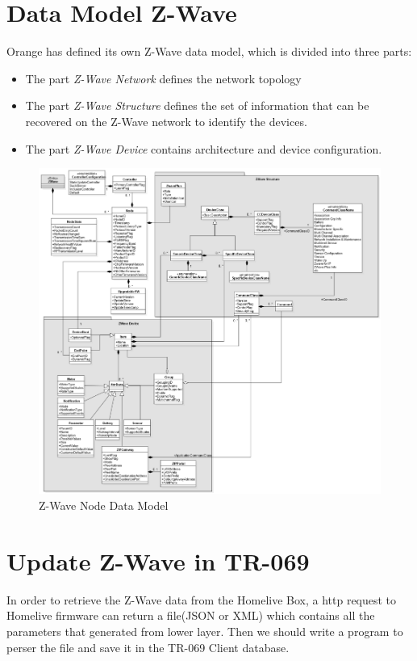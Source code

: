 \section{Data Model Z-Wave}
Orange has defined its own Z-Wave data model, which is divided into three parts:
\begin{itemize}
  \item The part \textit{Z-Wave Network} defines the network topology
  \item The part \textit{Z-Wave Structure} defines the set of information that can be recovered on the Z-Wave network to identify the devices.
  \item The part \textit{Z-Wave Device} contains architecture and device configuration.
\end{itemize}

\begin{figure}[htbp]
	\centering
		\includegraphics[width=14.5cm]{Figures/datamodel.png}
	\caption[Z-Wave Node Data Model]{Z-Wave Node Data Model}
	\label{fig:zwavedatamodel}
\end{figure}
\section{Update Z-Wave in TR-069}
In order to retrieve the Z-Wave data from the Homelive Box, a http request to Homelive firmware can return a file(JSON or XML) which contains all the parameters that generated from lower layer. Then we should write a program to perser the file and save it in the TR-069 Client database.

